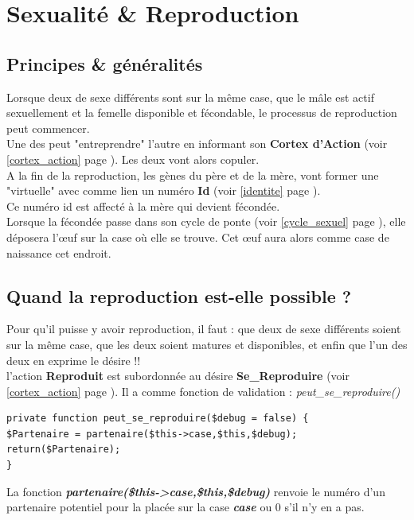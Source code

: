 \documentclass[french]{report}
\newlength{\du}\fi
\begin{document}
\chapter{Sexualité \& Reproduction}\label{sexualite}
\section{Principes \& généralités}

Lorsque deux \CoCiX de sexe différents sont sur la même case, que le mâle est actif sexuellement et la femelle disponible et fécondable, le processus de reproduction peut commencer.\\
Une des \CoCiX peut "entreprendre" l'autre en informant son \textbf{Cortex d'Action} (voir \ref{cortex_action} page \pageref{cortex_action}). Les deux \CoCiX vont alors copuler.\\
A la fin de la reproduction, les gènes du père et de la mère, vont former une \CoCiX "virtuelle" avec comme lien un numéro \textbf{Id\textit{}} (voir \ref{identite} page \pageref{identite}).\\
Ce numéro id est affecté à la mère qui devient fécondée.\\
Lorsque la \CoCiX fécondée passe dans son cycle de ponte (voir \ref{cycle_sexuel} page \pageref{cycle_sexuel}), elle déposera l’œuf sur la case où elle se trouve. Cet œuf aura alors comme case de naissance cet endroit.\\

\section{Quand la reproduction est-elle possible ?}

Pour qu'il puisse y avoir reproduction, il faut  : que deux \CoCiX de sexe différents soient sur la même case, que les deux soient matures et disponibles, et enfin que l'un des deux en exprime le désire !!\\

l'action \textbf{Reproduit} est subordonnée au désire \textbf{Se\_Reproduire} (voir \ref{cortex_action} page \pageref{cortex_action}). Il a comme fonction de validation : \textit{peut\_se\_reproduire()} \\


\begin{lstlisting}[frame = single,caption={peut\_se\_reproduire()en PHP TODO}]
private function peut_se_reproduire($debug = false) {
$Partenaire = partenaire($this->case,$this,$debug);
return($Partenaire); 
}
\end{lstlisting}
La fonction \textbf{\textit{partenaire(\$this->case,\$this,\$debug)} }renvoie le numéro d'un partenaire potentiel pour la \CoCiX placée sur la case \textit{\textbf{case}} ou 0 s'il n'y en a pas.\\
\end{document}
